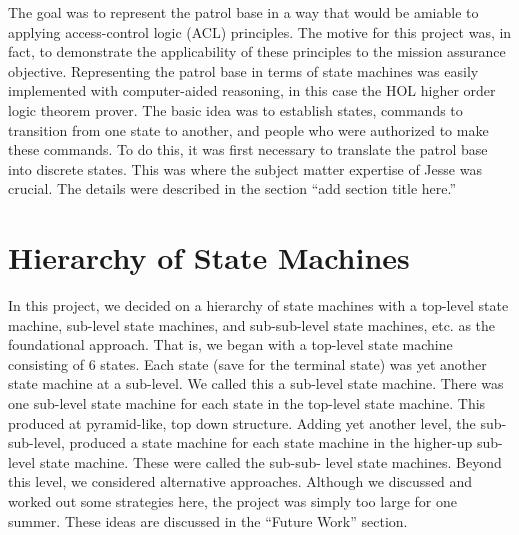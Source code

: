 The goal was to represent the patrol base in a way that would be amiable to applying access-control
logic (ACL) principles. The motive for this project was, in fact, to demonstrate the applicability
of these principles to the mission assurance objective. Representing the patrol base in terms of
state machines was easily implemented with computer-aided reasoning, in this case the HOL higher
order logic theorem prover. The basic idea was to establish states, commands to transition from one
state to another, and people who were authorized to make these commands. To do this, it was first
necessary to translate the patrol base into discrete states. This was where the subject matter
expertise of Jesse was crucial. The details were described in the section “add section title here.”


\section{Hierarchy of State Machines}
\label{sec:hier-state-mach}

In this project, we decided on a hierarchy of state machines with a top-level state machine,
sub-level state machines, and sub-sub-level state machines, etc. as the foundational approach.
That is, we began with a top-level state machine consisting of 6 states. Each state (save for the
terminal state) was yet another state machine at a sub-level. We called this a sub-level state machine.
There was one sub-level state machine for each state in the top-level state machine. This produced at
pyramid-like, top down structure. Adding yet another level, the sub-sub-level, produced a state
machine for each state machine in the higher-up sub-level state machine. These were called the sub-sub-
level state machines. Beyond this level, we considered alternative approaches. Although we discussed
and worked out some strategies here, the project was simply too large for one summer. These ideas are
discussed in the “Future Work” section.

